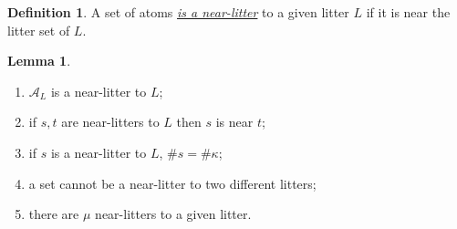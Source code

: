 \documentclass{article}
\newcommand{\cdef}[3]{\href{https://leanprover-community.github.io/con-nf/doc/ConNF/#1.html\#ConNF.#2}{\emph{#3}}}
\theoremstyle{definition}
\newtheorem{definition}{Definition}[section]
\newtheorem{lemma}[theorem]{Lemma}
\theoremstyle{remark}
\begin{document}
\begin{definition}
    A set of atoms \cdef{BaseType/NearLitter}{IsNearLitter}{is a near-litter} to a given litter \( L \) if it is near the litter set of \( L \).
\end{definition}
\begin{lemma}
    \label{lem:isNearLitter}
    \begin{enumerate}
        \item \( \mathcal A_L \) is a near-litter to \( L \);
        \item if \( s, t \) are near-litters to \( L \) then \( s \) is near \( t \);
        \item if \( s \) is a near-litter to \( L \), \( \#s = \#\kappa \);
        \item a set cannot be a near-litter to two different litters;
        \item there are \( \mu \) near-litters to a given litter.
    \end{enumerate}
\end{lemma}
\end{document}
